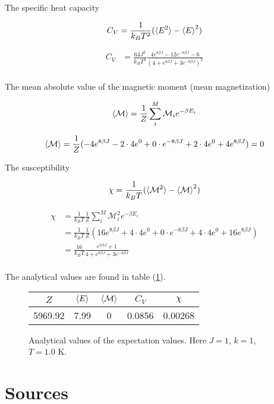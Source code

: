 \documentclass[11pt]{article}
\begin{document}
\begin{flushleft}
The specific heat capacity 

\begin{equation}
C_V = \frac{1}{k_B T^2} (\braket{E^2} - \braket{E}^2)
\end{equation}

\begin{align*}
C_V &= \frac{64J^2}{k_B T^2}
\frac{4 e^{8 \beta J} 
- 12 e^{-8 \beta J}  - 6 }{(4 + e^{8 \beta J} + 3 e^{-8 \beta J})^2}\\
\end{align*}


The mean absolute value of the magnetic moment (mean magnetization)

\begin{equation}
\braket{\mathcal{M}} = \frac{1}{Z} \sum_i^M \mathcal{M}_i e^{- \beta E_i}
\end{equation}

\begin{align*}
\braket{\mathcal{M}} = \frac{1}{Z} (-4 e^{8 \beta J} - 2 \cdot 4 e^0 + 0 \cdot e^{-8 \beta J} + 2 \cdot 4 e^0 + 4 e^{8 \beta J}) = 0
\end{align*}



The susceptibility

\begin{equation}
\chi = \frac{1}{k_B T} (\braket{\mathcal{M}^2} - \braket{\mathcal{M}}^2)
\end{equation}

\begin{align*}
\chi &= \frac{1}{k_B T} \frac{1}{Z} \sum_i^M \mathcal{M}_i^2 e^{- \beta E_i}\\
&= \frac{1}{k_B T} 
\frac{1}{Z} (16e^{8 \beta J} + 4 \cdot 4 e^0 + 0 \cdot e^{-8 \beta J} + 4 \cdot 4 e^0 + 16 e^{8 \beta J})\\
&= \frac{16}{k_B T} 
\frac{e^{8 \beta J} + 1}{4 + e^{8 \beta J} + 3 e^{-8 \beta J}} \\
\end{align*}

\end{flushleft}

\begin{flushleft}
The analytical values are found in table (\ref{fig: analytical}).

\begin{figure}[h]
\label{fig: analytical}
\centering
\begin{tabular}{|c|c|c|c|c|}
\hline
$Z$ &$\braket{E}$ & $\braket{\mathcal{M}}$ & $C_V$ & $\chi$\\
\hline
5969.92 & 7.99 & 0 & 0.0856 & 0.00268\\
\hline
\end{tabular}
\caption{Analytical values of the expectation values. Here $J=1$, $k=1$, $T=1.0$ K.}
\end{figure}
\end{flushleft}


\section{Sources}
\end{document}

